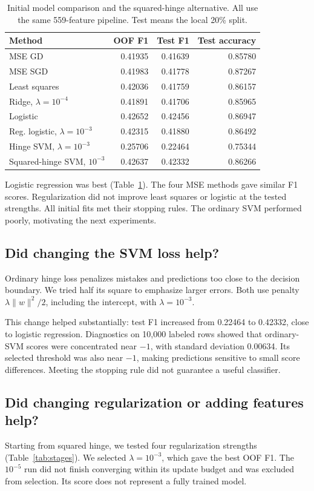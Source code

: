 \documentclass[10pt,conference,compsocconf,a4paper]{latex-example-paper/IEEEtran}
\begin{document}
\begin{table}[t]
\centering
\caption{Initial model comparison and the squared-hinge alternative.
All use the same 559-feature pipeline. Test means the local 20\% split.}
\label{tab:methods}
\setlength{\tabcolsep}{4pt}
\begin{tabular}{@{}lrrr@{}}
\toprule
Method & OOF F1 & Test F1 & Test accuracy \\
\midrule
MSE GD & 0.41935 & 0.41639 & 0.85780 \\
MSE SGD & 0.41983 & 0.41778 & 0.87267 \\
Least squares & 0.42036 & 0.41759 & 0.86157 \\
Ridge, $\lambda=10^{-4}$ & 0.41891 & 0.41706 & 0.85965 \\
Logistic & 0.42652 & 0.42456 & 0.86947 \\
Reg. logistic, $\lambda=10^{-3}$ & 0.42315 & 0.41880 & 0.86492 \\
Hinge SVM, $\lambda=10^{-3}$ & 0.25706 & 0.22464 & 0.75344 \\
Squared-hinge SVM, $10^{-3}$ & 0.42637 & 0.42332 & 0.86266 \\
\bottomrule
\end{tabular}
\end{table}

Logistic regression was best (Table~\ref{tab:methods}). The four MSE
methods gave similar F1 scores. Regularization did not improve least
squares or logistic at the tested strengths. All initial fits met their
stopping rules. The ordinary SVM performed poorly, motivating the next
experiments.

\subsection{Did changing the SVM loss help?}
Ordinary hinge loss penalizes mistakes and predictions too close to the
decision boundary. We tried half its square to emphasize larger errors.
Both use penalty $\lambda\|w\|^2/2$, including the intercept,
with $\lambda=10^{-3}$.

This change helped substantially: test F1 increased from 0.22464 to
0.42332, close to logistic regression. Diagnostics on 10{,}000 labeled
rows showed that ordinary-SVM scores were concentrated near $-1$, with
standard deviation 0.00634. Its selected threshold was also near $-1$,
making predictions sensitive to small score differences. Meeting the stopping rule did not guarantee a useful classifier.

\subsection{Did changing regularization or adding features help?}
Starting from squared hinge, we tested four regularization strengths
(Table~\ref{tab:stages}). We selected $\lambda=10^{-3}$, which gave the
best OOF F1. The $10^{-5}$ run did not finish converging within its update
budget and was excluded from selection. Its score does not represent a fully trained model.
\end{document}
